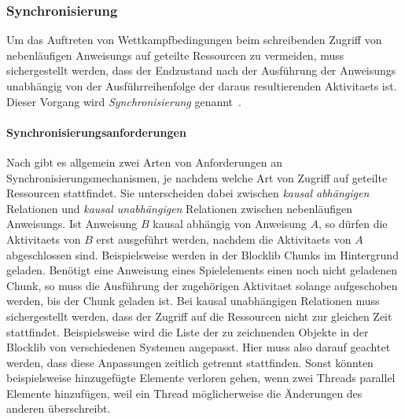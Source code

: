 \subsubsection{Synchronisierung}
Um das Auftreten von Wettkampfbedingungen beim schreibenden Zugriff von nebenläufigen \glspl{Anweisung} auf geteilte Ressourcen zu vermeiden, muss sichergestellt werden, dass der Endzustand nach der Ausführung der \glspl{Anweisung} unabhängig von der Ausführreihenfolge der daraus resultierenden \glspl{Aktivitaet} ist. Dieser Vorgang wird \emph{Synchronisierung} genannt~\cite[S.~4]{Maurer2019}.

\paragraph{Synchronisierungsanforderungen} Nach \textcite[S.~132~\psqq]{Herrtwich1989} gibt es allgemein zwei Arten von Anforderungen an Synchronisierungsmechanismen, je nachdem welche Art von Zugriff auf geteilte Ressourcen stattfindet. Sie unterscheiden dabei zwischen \emph{kausal abhängigen} Relationen und \emph{kausal unabhängigen} Relationen zwischen nebenläufigen \glspl{Anweisung}. Ist \gls{Anweisung} $B$ kausal abhängig von \gls{Anweisung} $A$, so dürfen die \glspl{Aktivitaet} von $B$ erst ausgeführt werden, nachdem die \glspl{Aktivitaet} von $A$ abgeschlossen sind. Beispielsweise werden in der Blocklib Chunks im Hintergrund geladen. Benötigt eine \gls{Anweisung} eines Spielelements einen noch nicht geladenen Chunk, so muss die Ausführung der zugehörigen \gls{Aktivitaet} solange aufgeschoben werden, bis der Chunk geladen ist. Bei kausal unabhängigen Relationen muss sichergestellt werden, dass der Zugriff auf die Ressourcen nicht zur gleichen Zeit stattfindet.  Beispielsweise wird die Liste der zu zeichnenden Objekte in der Blocklib von verschiedenen Systemen angepasst. Hier muss also darauf geachtet werden, dass diese Anpassungen zeitlich getrennt stattfinden. Sonst könnten beispielsweise hinzugefügte Elemente verloren gehen, wenn zwei Threads parallel Elemente hinzufügen, weil ein Thread möglicherweise die Änderungen des anderen überschreibt.

